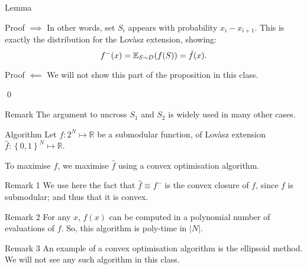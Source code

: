 \documentclass[a4paper]{article}
\begin{document}
\begin{parag}{Lemma}
\begin{subparag}{Proof $\implies$}
        In other words, set $S_i$ appears with probability $x_i - x_{i+1}$. This is exactly the distribution for the Lovàsz extension, showing: 
        \[f^-\left(x\right) = \exval_{S \followsdistr D}\left(f\left(S\right)\right) = \hat{f}\left(x\right).\]
    \end{subparag}

    \begin{subparag}{Proof $\impliedby$}
        We will not show this part of the proposition in this class.

        \qed
    \end{subparag}

    \begin{subparag}{Remark}
        The argument to uncross $S_1$ and $S_2$ is widely used in many other cases.
    \end{subparag}
\end{parag}

\begin{parag}{Algorithm}
    Let $f: 2^N \mapsto \mathbb{R}$ be a submodular function, of Lovàsz extension $\hat{f}: \left\{0, 1\right\}^N \mapsto \mathbb{R}$. 

    To maximise $f$, we maximise $\hat{f}$ using a convex optimisation algorithm. 

    \begin{subparag}{Remark 1}
        We use here the fact that $\hat{f} \equiv f^-$ is the convex closure of $f$, since $f$ is submodular; and thus that it is convex.
    \end{subparag}

    \begin{subparag}{Remark 2}
        For any $x$, $\hat{f}\left(x\right)$ can be computed in a polynomial number of evaluations of $f$. So, this algorithm is poly-time in $\left|N\right|$.
    \end{subparag}
    
    \begin{subparag}{Remark 3}
        An example of a convex optimisation algorithm is the ellipsoid method. We will not see any such algorithm in this class.
    \end{subparag}
\end{parag}
\end{document}
